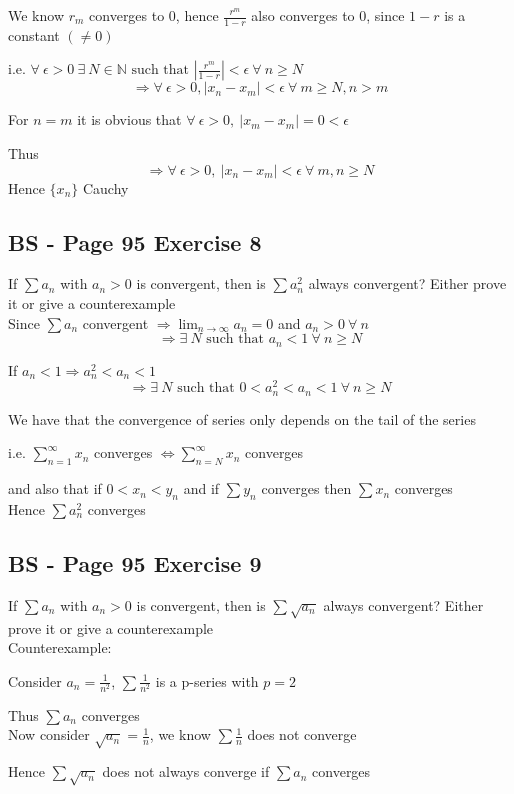 \documentclass{article}
\begin{document}
We know \(r_m\) converges to 0, hence \(\frac{r^m}{1-r}\) also converges to \(0\), since \(1-r\) is a constant \((\neq 0)\)

i.e. \(\forall \ \epsilon > 0 \ \exists \ N \in \mathbb{N} \text{ such that } |\frac{r^m}{1-r}| < \epsilon \ \forall \ n \geq N\)
\[
\Rightarrow \forall \ \epsilon > 0, |x_n - x_m| < \epsilon \ \forall \ m \geq N, n> m
\]

For \(n=m\) it is obvious that \(\forall \ \epsilon > 0, \  |x_m - x_m| = 0 < \epsilon \)

Thus
\[
\Rightarrow \forall \ \epsilon > 0, \ |x_n - x_m| < \epsilon \ \forall \ m,n \geq N
\]
Hence \(\{x_n\}\) Cauchy

\subsection*{BS - Page 95 Exercise 8}
If \(\sum a_n\) with \(a_n > 0 \) is convergent, then is \(\sum a_n^2\) always convergent?
Either prove it or give a counterexample
\\

Since \(\sum a_n\) convergent \(\Rightarrow \lim_{n\to\infty}{a_n} = 0\) and \(a_n > 0 \ \forall \ n\) 
\[
\Rightarrow \exists \ N \text{ such that } a_n < 1 \ \forall \ n \geq N
\]

If \(a_n < 1 \Rightarrow a_n^2 < a_n < 1\)
\[
\Rightarrow \exists \ N \text{ such that } 0 < a_n^2 < a_n < 1 \ \forall \ n \geq N
\]

We have that the convergence of series only depends on the tail of the series

i.e. \(\sum_{n=1}^\infty x_n\) converges \(\iff \sum_{n=N}^\infty x_n\) converges

and also that if \(0 < x_n < y_n \) and if \(\sum y_n \) converges then \(\sum x_n\) converges
\\

Hence \(\sum a_n^2\) converges









\subsection*{BS - Page 95 Exercise 9}
If \(\sum a_n\) with \(a_n > 0 \) is convergent, then is \(\sum \sqrt{a_n}\) always convergent?
Either prove it or give a counterexample
\\

Counterexample:

Consider \(a_n = \frac{1}{n^2}\), \(\sum \frac{1}{n^2}\) is a p-series with \(p = 2\)

Thus \(\sum a_n\) converges
\\

Now consider \(\sqrt{a_n} = \frac{1}{n}\), we know \(\sum \frac{1}{n}\) does not converge

Hence \(\sum \sqrt{a_n}\) does not always converge if \(\sum a_n\) converges
\end{document}
